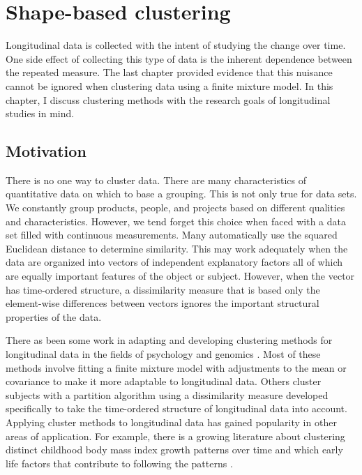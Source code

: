 \chapter{Shape-based clustering}
\label{chap:motivate}

Longitudinal data is collected with the intent of studying the change over time. One side effect of collecting this type of data is the inherent dependence between the repeated measure. The last chapter provided evidence that this nuisance cannot be ignored when clustering data using a finite mixture model. In this chapter, I discuss clustering methods with the research goals of longitudinal studies in mind. 

\section{Motivation}
There is no one way to cluster data. There are many characteristics of quantitative data on which to base a grouping. This is not only true for data sets. We constantly group products, people, and projects based on different qualities and characteristics. However, we tend forget this choice when faced with a data set filled with continuous measurements. Many automatically use the squared Euclidean distance to determine similarity. This may work adequately when the data are organized into vectors of independent explanatory factors all of which are equally important features of the object or subject. However, when the vector has time-ordered structure, a dissimilarity measure that is based only the element-wise differences between vectors ignores the important structural properties of the data.  

There as been some work in adapting and developing clustering methods for longitudinal data in the fields of psychology and genomics \cite{schneiderman1993,genolini2010, jones2001, muthen2010, mcnicholas2010}. Most of these methods involve fitting a finite mixture model with adjustments to the mean or covariance to make it more adaptable to longitudinal data. Others cluster subjects with a partition algorithm using a dissimilarity measure developed specifically to take the time-ordered structure of longitudinal data into account. Applying cluster methods to longitudinal data has gained popularity in other areas of application. For example, there is a growing literature about clustering distinct childhood body mass index growth patterns over time and which early life factors that contribute to following the patterns \cite{pryor2011,carter2012}. 

